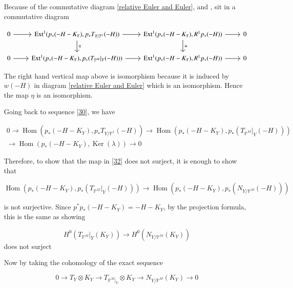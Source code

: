 \documentclass[11pt,twoside]{amsart}
\theoremstyle{plain}
\numberwithin{equation}{section}
\theoremstyle{definition}
\begin{document}
Because of the commutative diagram \ref{relative Euler and Euler},  
 and , sit in a commutative diagram

\[
\begin{tikzcd}
0 \arrow[r] & \operatorname{Ext}^1(p_*(-H-K_Y), p_*T_{Y/\mathbb{P}^1}(-H)) \arrow[d, "\eta"] \arrow[r] & \operatorname{Ext}^1(p_*(-H-K_Y), R^1p_*(-H)) \arrow[r] \arrow[d, "\cong"] & 0 \\
0 \arrow[r] & \operatorname{Ext^1}(p_*(-H-K_Y), 
 p_*(T_{\mathbb{P}^M}|_Y(-H))) \arrow[r] & \operatorname{Ext}^1(p_*(-H-K_Y), R^1p_*(-H)) \arrow[r] & 0
\end{tikzcd}
\]

The right hand vertical map above is isomorphism because it is induced by $w(-H)$ in diagram \ref{relative Euler and Euler} which is an isomorphism. Hence the map $\eta$ is an isomorphism.

\color{black}
Going back to sequence \ref{30}, we have 

\begin{multline}\label{31}
0 \to \operatorname{Hom}(p_*(-H-K_Y), 
 p_*T_{Y/\mathbb{P}^1}(-H))  \to \operatorname{Hom}(p_*(-H-K_Y), p_*(T_{\mathbb{P}^M}|_Y(-H))) \\ \to \operatorname{Hom}(p_*(-H-K_Y),\operatorname{Ker}(\lambda)) \to 0
\end{multline}

Therefore, to show that the map in \ref{32} does not surject, it is enough to show that

\begin{equation}\label{33}
  \operatorname{Hom}(p_*(-H-K_Y), p_*(T_{\mathbb{P}^M}|_Y(-H))) \to \operatorname{Hom}(p_*(-H-K_Y), p_*(N_{Y/\mathbb{P}^M}(-H)))  
\end{equation}

is not surjective. Since $p^*p_*(-H-K_Y) = -H-K_Y$, by the projection formula, this is the same as showing 

\begin{equation}\label{34}
   H^0(T_{\mathbb{P}^M}|_Y(K_Y)) \to H^0(N_{Y/\mathbb{P}^M}(K_Y)) 
\end{equation}
does not surject

Now by taking the cohomology of the exact sequence 

$$0 \to T_Y \otimes K_Y \to T_{\mathbb{P}^M|_Y} \otimes K_Y \to N_{Y/\mathbb{P}^M}(K_Y) \to 0$$
\end{document}
